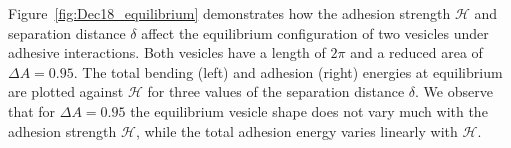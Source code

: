 \documentclass[prf,superscriptaddress,showpacs]{revtex4-1}
\begin{document}
Figure~\ref{fig:Dec18_equilibrium} demonstrates how the adhesion
strength $\mathcal{H}$ and separation distance $\delta$ affect the
equilibrium configuration of two vesicles under adhesive interactions.
Both vesicles have a length of $2\pi$ and a reduced area of $\Delta A =
0.95$.  The total bending (left) and adhesion (right) energies at
equilibrium are plotted against $\mathcal{H}$ for three values of the
separation distance $\delta$.  We observe that for $\Delta A=0.95$ the
equilibrium vesicle shape does not vary much with the adhesion strength
$\mathcal{H}$, while the total adhesion energy varies linearly with
$\mathcal{H}$.

%
%
%
%
%
\end{document}

